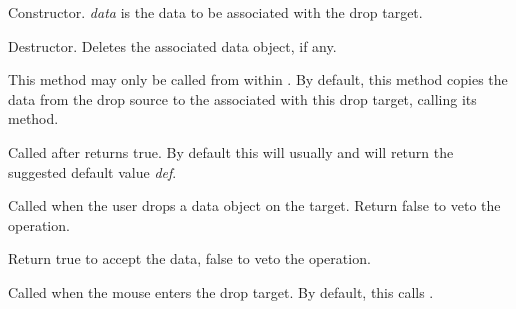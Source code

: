 
Constructor. {\it data} is the data to be associated with the drop target.

\label{wxdroptargetdtor}


Destructor. Deletes the associated data object, if any.

\label{wxdroptargetgetdata}


This method may only be called from within .
By default, this method copies the data from the drop source to the 
 associated with this drop target,
calling its  method.

\label{wxdroptargetondata}


Called after  returns true. By default this
will usually  and will return the suggested
default value {\it def}.

\label{wxdroptargetondrop}


Called when the user drops a data object on the target. Return false to veto the operation.





Return true to accept the data, false to veto the operation.

\label{wxdroptargetonenter}


Called when the mouse enters the drop target. By default, this calls .

